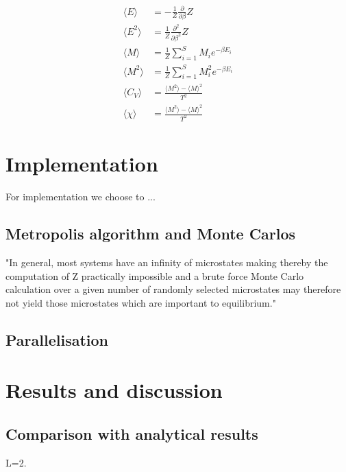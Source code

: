 \documentclass{article}
\begin{document}
\begin{align}
    \langle E \rangle &= - \frac{1}{Z} \frac{\partial}{\partial \beta}Z\\
    \langle E^2 \rangle &= \frac{1}{Z} \frac{\partial^2}{\partial \beta^2} Z\\
    \langle M \rangle &= \frac{1}{Z} \sum_{i=1}^S M_i e^{-\beta E_i}\\
    \langle M^2 \rangle &= \frac{1}{Z} \sum_{i=1}^S M_i^2 e^{-\beta E_i}\\
    \langle C_V \rangle &= \frac{\langle M^2 \rangle - \langle M \rangle^2}{T^2}\\
    \langle \chi \rangle &= \frac{\langle M^2 \rangle - \langle M \rangle^2}{T^2}
\end{align}



\section{Implementation}

For implementation we choose to ...

\subsection{Metropolis algorithm and Monte Carlos}

"In general, most systems have an infinity of microstates making thereby the computation of Z practically impossible and a brute force Monte Carlo calculation over a given number of randomly selected microstates may therefore not yield those microstates which are important to equilibrium."\cite{mhj}


\subsection{Parallelisation}






\section{Results and discussion}

\subsection{Comparison with analytical results}

L=2.
\end{document}
